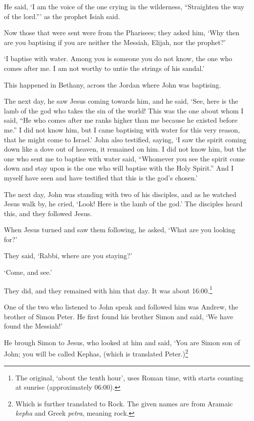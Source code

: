 He said, 
`I am the voice of the one crying in the wilderness,
``Straighten the way of the lord.'''
as the prophet Isiah said.

Now those that were sent were from the Pharisees;
they asked him, 
`Why then are you baptising 
if you are neither the Messiah, Elijah, nor the prophet?'

`I baptise with water.  Among you is someone you do not know,
the one who comes after me.  
I am not worthy to untie the strings of his sandal.'

This happened in Bethany, across the Jordan where John was baptising.

The next day, he saw Jesus coming towards him, and he said,
`See, here is the lamb of the god who takes the sin of the world!
This was the one about whom I said,
``He who comes after me ranks higher than me
because he existed before me.''
I did not know him, but I came baptising with water for this very reason,
that he might come to Israel.'
John also testified, saying, 
`I saw the spirit coming down like a dove out of heaven,
it remained on him.
I did not know him, 
but the one who sent me to baptise with water said,
``Whomever you see the spirit come down and stay upon 
is the one who will baptise with the Holy Spirit.''
And I myself have seen and have testified that this is the god's chosen.'

The next day,
John was standing with two of his disciples,
and as he watched Jesus walk by, he cried, 
`Look! Here is the lamb of the god.'
The disciples heard this, and they followed Jesus. 

When Jesus turned and saw them following, he asked,
`What are you looking for?'

They said, `Rabbi, where are you staying?'

`Come, and see.'

They did, and they remained with him that day. 
It was about 16:00.\footnote{The original, `about the tenth hour',
uses Roman time, with starts counting at sunrise (approximately 06:00).
}

One of the two who listened to John speak and followed him was Andrew,
the brother of Simon Peter.
He first found his brother Simon and said,
`We have found the Messiah!'

He brough Simon to Jesus,
who looked at him and said,
`You are Simon son of John; 
you will be called Kephas,
(which is translated Peter.)\footnote{
    Which is further translated to Rock. 
    The given names are from Aramaic \textit{kepha}
    and Greek \textit{petra}, meaning rock.
}

